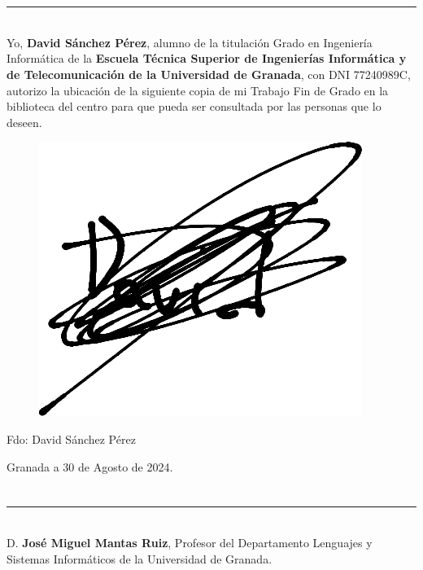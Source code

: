 \chapter*{}
\thispagestyle{empty}

\noindent\rule[-1ex]{\textwidth}{2pt}\\[4.5ex]

Yo, \textbf{David Sánchez Pérez}, alumno de la titulación Grado en Ingeniería Informática de la \textbf{Escuela Técnica Superior
de Ingenierías Informática y de Telecomunicación de la Universidad de Granada}, con DNI 77240989C, autorizo la
ubicación de la siguiente copia de mi Trabajo Fin de Grado en la biblioteca del centro para que pueda ser
consultada por las personas que lo deseen.

\vspace{6cm}
\begin{figure}[H]
	\centering
	\includegraphics[scale=0.12]{imagenes/firma.png}  
\end{figure}
\noindent Fdo: David Sánchez Pérez

\vspace{2cm}

\begin{flushright}
Granada a 30 de Agosto de 2024.
\end{flushright}


\chapter*{}
\thispagestyle{empty}

\noindent\rule[-1ex]{\textwidth}{2pt}\\[4.5ex]

D. \textbf{José Miguel Mantas Ruiz}, Profesor del Departamento Lenguajes y Sistemas Informáticos de la Universidad de Granada.

